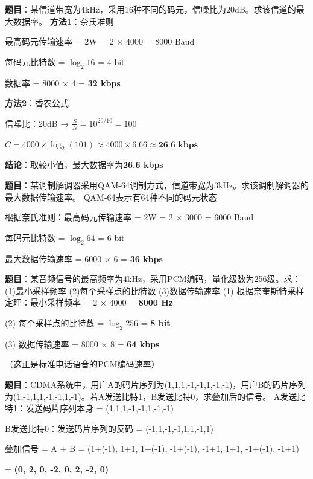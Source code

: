 \begin{examplebox}
\textbf{题目}：某信道带宽为4kHz，采用16种不同的码元，信噪比为20dB。求该信道的最大数据率。
\tcblower
\textbf{方法1}：奈氏准则

最高码元传输速率 = 2W = 2 × 4000 = 8000 Baud

每码元比特数 = $\log_2 16$ = 4 bit

数据率 = 8000 × 4 = \textbf{32 kbps}

\textbf{方法2}：香农公式

信噪比：20dB → $\frac{S}{N} = 10^{20/10} = 100$

$C = 4000 \times \log_2(101) \approx 4000 \times 6.66 \approx \textbf{26.6 kbps}$

\textbf{结论}：取较小值，最大数据率为\textbf{26.6 kbps}
\end{examplebox}

\begin{examplebox}
\textbf{题目}：某调制解调器采用QAM-64调制方式，信道带宽为3kHz。求该调制解调器的最大数据传输速率。
\tcblower
QAM-64表示有64种不同的码元状态

根据奈氏准则：最高码元传输速率 = 2W = 2 × 3000 = 6000 Baud

每码元比特数 = $\log_2 64$ = 6 bit

最大数据传输速率 = 6000 × 6 = \textbf{36 kbps}
\end{examplebox}

\begin{examplebox}
\textbf{题目}：某音频信号的最高频率为4kHz，采用PCM编码，量化级数为256级。求：(1)最小采样频率 (2)每个采样点的比特数 (3)数据传输速率
\tcblower
(1) 根据奈奎斯特采样定理：最小采样频率 = 2 × 4000 = \textbf{8000 Hz}

(2) 每个采样点的比特数 = $\log_2 256$ = \textbf{8 bit}

(3) 数据传输速率 = 8000 × 8 = \textbf{64 kbps}

（这正是标准电话语音的PCM编码速率）
\end{examplebox}

\begin{examplebox}
\textbf{题目}：CDMA系统中，用户A的码片序列为(1,1,1,-1,-1,1,-1,-1)，用户B的码片序列为(1,-1,1,1,-1,-1,1,-1)。若A发送比特1，B发送比特0，求叠加后的信号。
\tcblower
A发送比特1：发送码片序列本身 = (1,1,1,-1,-1,1,-1,-1)

B发送比特0：发送码片序列的反码 = (-1,1,-1,-1,1,1,-1,1)

叠加信号 = A + B = (1+(-1), 1+1, 1+(-1), -1+(-1), -1+1, 1+1, -1+(-1), -1+1)

= \textbf{(0, 2, 0, -2, 0, 2, -2, 0)}
\end{examplebox}
